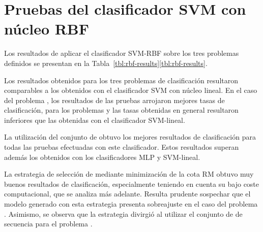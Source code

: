 %
%
%
\section{Pruebas del clasificador SVM con núcleo RBF}
%
Los resultados de aplicar el clasificador SVM-RBF sobre los tres
problemas definidos se presentan en la
\iflatexml{}Tabla~\ref{tbl:rbf-results}\else\autoref{tbl:rbf-results}\fi.

Los resultados obtenidos para los tres problemas de clasificación
resultaron comparables a los obtenidos con el clasificador SVM con
núcleo lineal.
En el caso del problema \prob\tripletsvm{}, los resultados de las
pruebas arrojaron mejores tasas de clasificación, para los problemas
\prob\mipred{} y \prob\micropred{} las tasas obtenidas en general
resultaron inferiores que las obtenidas con el clasificador SVM-lineal.

La utilización del conjunto de   obtuvo los mejores
resultados de clasificación para todas las pruebas efectuadas con este
clasificador.
Estos resultados superan además los obtenidos con los clasificadores
MLP y SVM-lineal.

La estrategia de selección de  mediante minimización de la
cota RM obtuvo muy buenos resultados de clasificación, especialmente
teniendo en cuenta su bajo coste computacional, que se analiza más
adelante.
Resulta prudente sospechar que el modelo generado con esta estrategia
presenta sobreajuste en el caso del problema \prob\tripletsvm{}.
Asimismo, se observa que la estrategia divirgió al utilizar el
conjunto de  de secuencia  para el problema
\prob\mipred{}.
